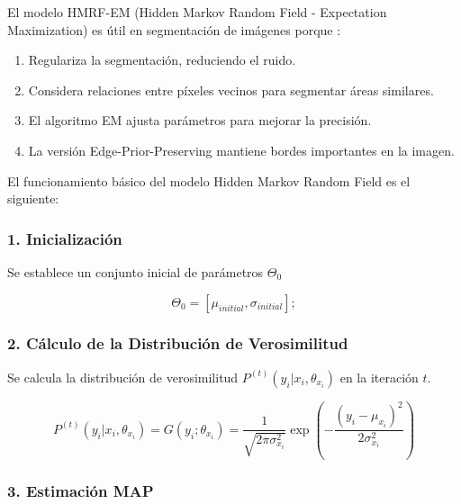 El modelo HMRF-EM (Hidden Markov Random Field - Expectation Maximization) es útil en segmentación de imágenes porque :

\begin{enumerate}
\setlength{\itemsep}{-1ex}
   \item{\begin{flushleft} Regulariza la segmentación, reduciendo el ruido. \end{flushleft}}
   \item{\begin{flushleft} Considera relaciones entre píxeles vecinos para segmentar áreas similares. \end{flushleft}}
   \item{\begin{flushleft} El algoritmo EM ajusta parámetros para mejorar la precisión. \end{flushleft}}
   \item{\begin{flushleft} La versión Edge-Prior-Preserving mantiene bordes importantes en la imagen. \end{flushleft}}
\end{enumerate}

El funcionamiento básico del modelo Hidden Markov Random Field es el siguiente:

\subsubsection{1. Inicialización}

Se establece un conjunto inicial de parámetros $\Theta_0$

$$\Theta_0 =[\mu_{initial} ,\sigma_{initial} ];$$

\subsubsection{2. Cálculo de la Distribución de Verosimilitud}

Se calcula la distribución de verosimilitud $P^{(t)} (y_i |x_i ,\theta_{x_i } )$ en la iteración $t$.

$$P^{(t)} (y_i |x_i ,\theta_{x_i } )=G(y_i ;\theta_{x_i } )=\frac{1}{\sqrt{2\pi \sigma_{x_i }^2 }}\exp \left(-\frac{(y_i -\mu_{x_i } )^2 }{2\sigma_{x_i }^2 }\right)$$

\subsubsection{3. Estimación MAP}

